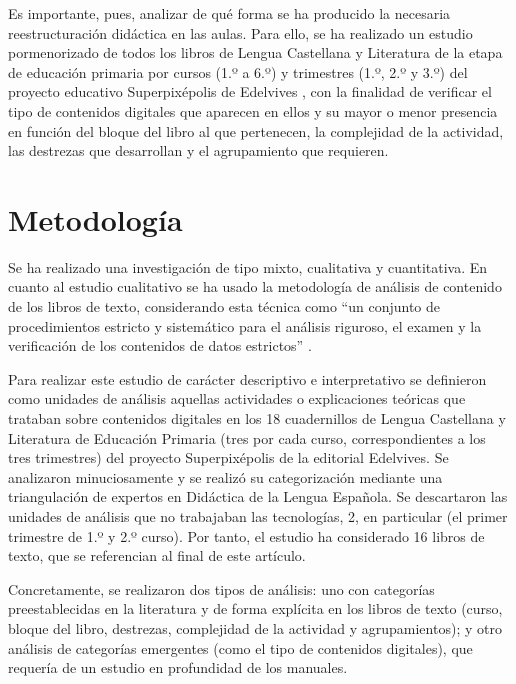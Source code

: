 \documentclass{textolivre}
\begin{document}
Es importante, pues, analizar de qué forma se ha producido la necesaria reestructuración didáctica en las aulas. Para ello, se ha realizado un estudio pormenorizado de todos los libros de Lengua Castellana y Literatura de la etapa de educación primaria por cursos (1.º a 6.º) y trimestres (1.º, 2.º y 3.º) del proyecto educativo Superpixépolis de Edelvives \cite{araya_olazaran_lengua_2014-1,araya_olazaran_lengua_2014, araya_olazaran_lengua_2015-1,araya_olazaran_lengua_2015-2, araya_olazaran_lengua_2015-3,araya_olazaran_lengua_2015}, con la finalidad de verificar el tipo de contenidos digitales que aparecen en ellos y su mayor o menor presencia en función del bloque del libro al que pertenecen, la complejidad de la actividad, las destrezas que desarrollan y el agrupamiento que requieren.

\section{Metodología}\label{sec-metodologia}
Se ha realizado una investigación de tipo mixto, cualitativa y cuantitativa. En cuanto al estudio cualitativo se ha usado la metodología de análisis de contenido de los libros de texto, considerando esta técnica como “un conjunto de procedimientos estricto y sistemático para el análisis riguroso, el examen y la verificación de los contenidos de datos estrictos” \cite[p. 563]{cohen_research_2011}.

Para realizar este estudio de carácter descriptivo e interpretativo se definieron como unidades de análisis aquellas actividades o explicaciones teóricas que trataban sobre contenidos digitales en los 18 cuadernillos de Lengua Castellana y Literatura de Educación Primaria (tres por cada curso, correspondientes a los tres trimestres) del proyecto Superpixépolis de la editorial Edelvives. Se analizaron minuciosamente y se realizó su categorización mediante una triangulación de expertos en Didáctica de la Lengua Española. Se descartaron las unidades de análisis que no trabajaban las tecnologías, 2, en particular (el primer trimestre de 1.º y 2.º curso). Por tanto, el estudio ha considerado 16 libros de texto, que se referencian al final de este artículo. 

Concretamente, se realizaron dos tipos de análisis: uno con categorías preestablecidas en la literatura y de forma explícita en los libros de texto (curso, bloque del libro, destrezas, complejidad de la actividad y agrupamientos); y otro análisis de categorías emergentes (como el tipo de contenidos digitales), que requería de un estudio en profundidad de los manuales. 
\end{document}
